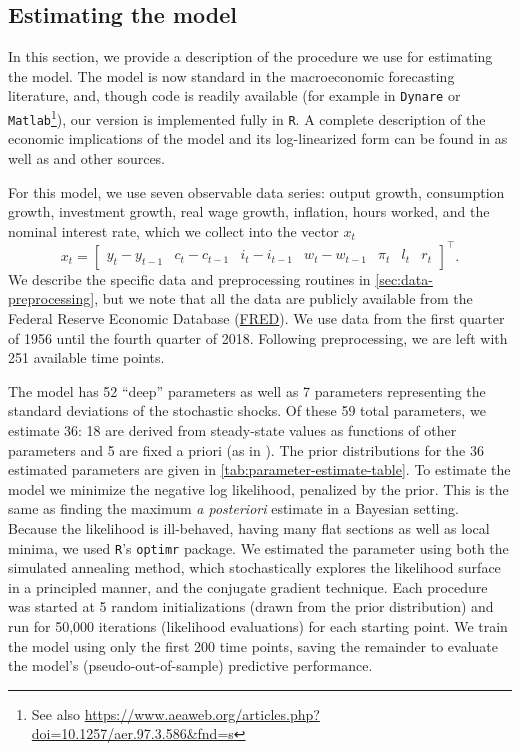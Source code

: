 \documentclass[11pt]{article}
\begin{document}
\subsection{Estimating the \citet{SmetsWouters2007} model}
\label{sec:estim-sw-model}

In this section, we provide a description of the procedure we use for
estimating the \citet{SmetsWouters2007} model. The model is now standard
in the macroeconomic forecasting literature, and, though code is readily
available (for example in \texttt{Dynare} or
\texttt{Matlab}\footnote{See also
  \url{https://www.aeaweb.org/articles.php?doi=10.1257/aer.97.3.586&fnd=s}}),
our version is implemented fully in \texttt{R}. A complete description
of the economic implications of the model and its log-linearized form
can be found in \citet{SmetsWouters2007} as well as \citet{Iskrev2009}
and other sources.

For this model, we use seven observable data series: output growth,
consumption growth, investment growth, real wage growth, inflation,
hours worked, and the nominal interest rate, which we collect into the
vector \(x_t\) \begin{equation}
  x_t = \begin{bmatrix} y_t-y_{t-1} & c_t - c_{t-1} & i_t-i_{t-1} &
    w_t-w_{t-1} & \pi_t & l_t & r_t \end{bmatrix}^\top.
\end{equation} We describe the specific data and preprocessing routines
in \autoref{sec:data-preprocessing}, but we note that all the data are
publicly available from the Federal Reserve Economic Database
(\href{http://research.stlouisfed.org/fred2/}{FRED}). We use data from
the first quarter of 1956 until the fourth quarter of 2018. Following
preprocessing, we are left with 251 available time points.

The model has 52 ``deep'' parameters as well as 7 parameters
representing the standard deviations of the stochastic shocks. Of these
59 total parameters, we estimate 36: 18 are derived from steady-state
values as functions of other parameters and 5 are fixed a priori (as in
\citealt{SmetsWouters2007}). The prior distributions for the 36
estimated parameters are given in
\autoref{tab:parameter-estimate-table}. To estimate the model we
minimize the negative log likelihood, penalized by the prior. This is
the same as finding the maximum \emph{a posteriori} estimate in a
Bayesian setting. Because the likelihood is ill-behaved, having many
flat sections as well as local minima, we used \texttt{R}'s
\texttt{optimr} package. We estimated the parameter using both the
simulated annealing method, which stochastically explores the likelihood
surface in a principled manner, and the conjugate gradient technique.
Each procedure was started at 5 random initializations (drawn from the
prior distribution) and run for 50,000 iterations (likelihood
evaluations) for each starting point. We train the model using only the
first 200 time points, saving the remainder to evaluate the model's
(pseudo-out-of-sample) predictive performance.
\end{document}
